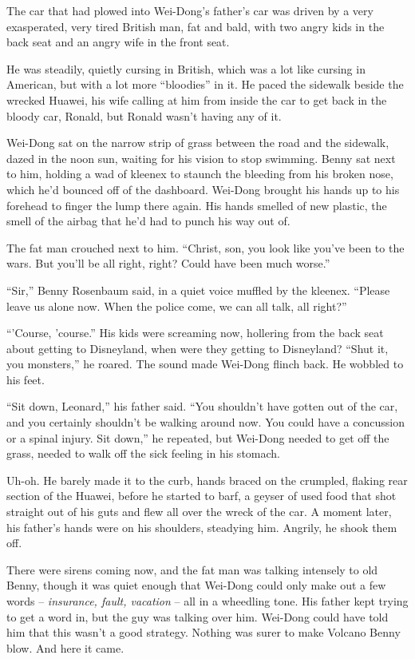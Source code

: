 The car that had plowed into Wei-Dong's father's car was driven by
a very exasperated, very tired British man, fat and bald, with two
angry kids in the back seat and an angry wife in the front seat.

He was steadily, quietly cursing in British, which was a lot like
cursing in American, but with a lot more ``bloodies'' in it. He paced
the sidewalk beside the wrecked Huawei, his wife calling at him
from inside the car to get back in the bloody car, Ronald, but
Ronald wasn't having any of it.

Wei-Dong sat on the narrow strip of grass between the road and the
sidewalk, dazed in the noon sun, waiting for his vision to stop
swimming. Benny sat next to him, holding a wad of kleenex to
staunch the bleeding from his broken nose, which he'd bounced off
of the dashboard. Wei-Dong brought his hands up to his forehead to
finger the lump there again. His hands smelled of new plastic, the
smell of the airbag that he'd had to punch his way out of.

The fat man crouched next to him. ``Christ, son, you look like
you've been to the wars. But you'll be all right, right? Could have
been much worse.''

``Sir,'' Benny Rosenbaum said, in a quiet voice muffled by the
kleenex. ``Please leave us alone now. When the police come, we can
all talk, all right?''

``'Course, 'course.'' His kids were screaming now, hollering from the
back seat about getting to Disneyland, when were they getting to
Disneyland? ``Shut it, you monsters,'' he roared. The sound made
Wei-Dong flinch back. He wobbled to his feet.

``Sit down, Leonard,'' his father said. ``You shouldn't have gotten
out of the car, and you certainly shouldn't be walking around now.
You could have a concussion or a spinal injury. Sit down,'' he
repeated, but Wei-Dong needed to get off the grass, needed to walk
off the sick feeling in his stomach.

Uh-oh. He barely made it to the curb, hands braced on the crumpled,
flaking rear section of the Huawei, before he started to barf, a
geyser of used food that shot straight out of his guts and flew all
over the wreck of the car. A moment later, his father's hands were
on his shoulders, steadying him. Angrily, he shook them off.

There were sirens coming now, and the fat man was talking intensely
to old Benny, though it was quiet enough that Wei-Dong could only
make out a few words -- \emph{insurance, fault, vacation} -- all in
a wheedling tone. His father kept trying to get a word in, but the
guy was talking over him. Wei-Dong could have told him that this
wasn't a good strategy. Nothing was surer to make Volcano Benny
blow. And here it came.


